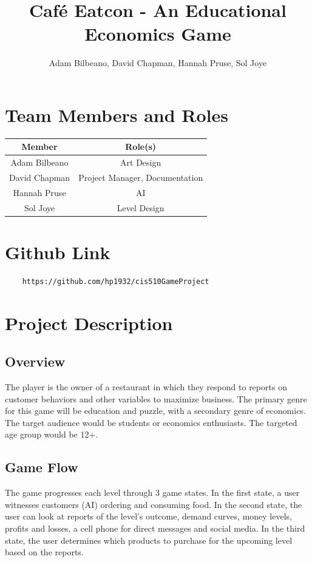 \documentclass{article}
\title{Caf\'{e} Eatcon - An Educational Economics Game}
\author{Adam Bilbeano, David Chapman, Hannah Pruse, Sol Joye}
\date{}
\begin{document}
\maketitle

\section{Team Members and Roles}
\begin{center}
\begin{tabular}{|c|c|}
	\hline
	\textbf{Member} & \textbf{Role(s)}\\
	\hline
	Adam Bilbeano & Art Design \\
	\hline
	David Chapman & Project Manager, Documentation \\
	\hline
	Hannah Pruse & AI \\
	\hline
	Sol Joye & Level Design \\
	\hline
\end{tabular}
\end{center}

\section{Github Link}
\begin{center}
\begin{verbatim}
	https://github.com/hp1932/cis510GameProject
\end{verbatim}
\end{center}

\section{Project Description}
\subsection{Overview}
The player is the owner of a restaurant in which they respond to reports on customer behaviors and other variables to maximize business. The primary genre for this game will be education and puzzle, with a secondary genre of economics. The target audience would be students or economics enthusiasts. The targeted age group would be 12+.

\subsection{Game Flow}
The game progresses each level through 3 game states. In the first state, a user witnesses customers (AI) ordering and consuming food. In the second state, the user can look at reports of the level's outcome, demand curves, money levels, profits and losses, a cell phone for direct messages and social media. In the third state, the user determines which products to purchase for the upcoming level based on the reports.
\end{document}
